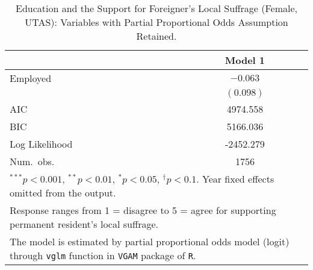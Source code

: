 
\begin{table}
\caption{Education and the Support for Foreigner's Local Suffrage (Female, UTAS): Variables with Partial Proportional Odds Assumption Retained.}
\begin{center}
\begin{tabular}{l c }
\toprule
 & Model 1 \\
\midrule
Employed       & $-0.063$  \\
               & $(0.098)$ \\
\midrule
AIC            & 4974.558  \\
BIC            & 5166.036  \\
Log Likelihood & -2452.279 \\
Num.\ obs.     & 1756      \\
\bottomrule
\multicolumn{2}{l}{\scriptsize{$^{***}p<0.001$, $^{**}p<0.01$, $^*p<0.05$, $^{\dagger}p<0.1$. Year fixed effects omitted from the output.}} \\ \multicolumn{2}{l}{\scriptsize{Response ranges from 1 = disagree to 5 = agree for supporting permanent resident's local suffrage.}} \\ \multicolumn{2}{l}{\scriptsize{The model is estimated by partial proportional odds model (logit) through \texttt{vglm} function in \texttt{VGAM} package of \texttt{R}.}}
\end{tabular}
\label{goltab_umof_pr}
\end{center}
\end{table}

